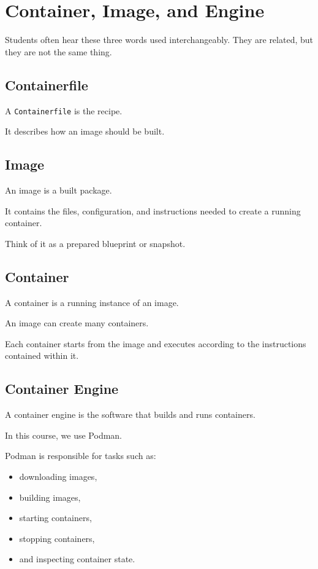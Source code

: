 \section{Container, Image, and Engine}

Students often hear these three words used interchangeably. They are related, but they are not the same thing.

\subsection*{Containerfile}

A \texttt{Containerfile} is the recipe.

It describes how an image should be built.

\subsection*{Image}

An image is a built package.

It contains the files, configuration, and instructions needed to create a running container.

Think of it as a prepared blueprint or snapshot.

\subsection*{Container}

A container is a running instance of an image.

An image can create many containers.

Each container starts from the image and executes according to the instructions contained within it.

\subsection*{Container Engine}

A container engine is the software that builds and runs containers.

In this course, we use Podman.

Podman is responsible for tasks such as:

\begin{itemize}
  \item downloading images,
  \item building images,
  \item starting containers,
  \item stopping containers,
  \item and inspecting container state.
\end{itemize}

